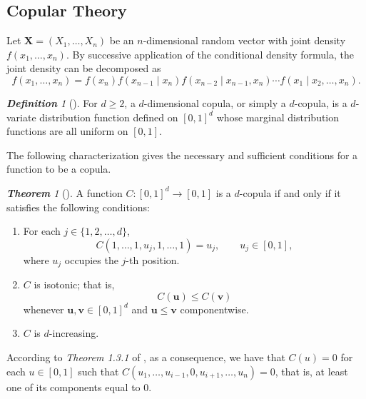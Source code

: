 \documentclass[12pt,oneside,a4paper]{book}
\theoremstyle{definition}
\theoremstyle{remark}
\newtheorem{defn}{\bf Definition}[subsection]
\newtheorem{thm}{\bf Theorem}[subsection]
\begin{document}
			\subsection{Copular Theory}
				Let $\mathbf{X}=(X_1,\ldots,X_n)$ be an $n$-dimensional random vector with joint density $f(x_1,\ldots,x_n)$. By successive application of the conditional density formula, the joint density can be decomposed as
				\begin{equation}\label{Eq:joint_pdf}
					f(x_1,\ldots,x_n)
					=
					f(x_n)
					f(x_{n-1}\mid x_n)
					f(x_{n-2}\mid x_{n-1},x_n)
					\cdots
					f(x_1\mid x_2,\ldots,x_n).
				\end{equation}

				\begin{defn}[\cite{jaworski2010copula}]
					\label{dfn:copula}
					For $d\geq 2$, a $d$-dimensional copula, or simply a $d$-copula, is a $d$-variate distribution function defined on $[0,1]^d$ whose marginal distribution functions are all uniform on $[0,1]$.
				\end{defn}

				The following characterization gives the necessary and sufficient conditions for a function to be a copula.

				\begin{thm}[\cite{jaworski2010copula}]
					\label{thm:copula_characterization}
					A function $C:[0,1]^d\rightarrow[0,1]$ is a $d$-copula if and only if it satisfies the following conditions:
					\begin{enumerate}
						\item For each $j\in\{1,2,\ldots,d\}$,
						\[
						C(1,\ldots,1,u_j,1,\ldots,1)=u_j,
						\qquad u_j\in[0,1],
						\]
						where $u_j$ occupies the $j$-th position.

						\item $C$ is isotonic; that is,
						\[
						C(\mathbf{u})\leq C(\mathbf{v})
						\]
						whenever $\mathbf{u},\mathbf{v}\in[0,1]^d$ and $\mathbf{u}\leq\mathbf{v}$ componentwise.

						\item $C$ is $d$-increasing.
					\end{enumerate}
				\end{thm}
				According to \textit{Theorem 1.3.1} of \cite{jaworski2010copula}, as a consequence, we have that $C(u)=0$ for each $u \in [0,1]$ such that $C(u_1,\dots,u_{i-1},0,u_{i+1},\dots,u_n)=0$, that is, at least one of its components equal to 0.
\end{document}
